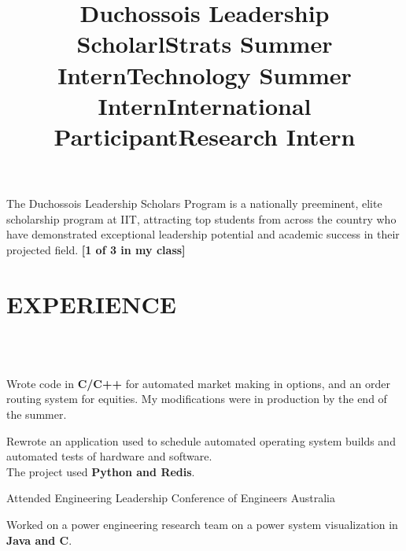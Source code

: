 \documentclass{res}
\begin{document}
\begin{resume}
\title{{\bf Duchossois Leadership Scholar}}
\begin{position}
  The Duchossois Leadership Scholars Program is a nationally preeminent, elite scholarship program at IIT, attracting top students from across the country who have demonstrated exceptional leadership potential and academic success in their projected field. {\bf [1 of 3 in my class]}
\end{position}
 
\section{EXPERIENCE}
\begin{format}
  \title{l}  \\
  \body\\
\end{format}

\title{\bf Strats Summer Intern}
\begin{position}
     Wrote code in {\bf C/C++} for automated market making in options, and an order routing system for equities. My modifications were in production by the end of the summer.
\end{position}

\title{\bf Technology Summer Intern}
\begin{position}
     Rewrote an application used to schedule automated operating system builds and automated tests of hardware and software.\\
     The project used {\bf Python and Redis}.
\end{position}

\title{\bf International Participant}
\begin{position}
  Attended Engineering Leadership Conference of Engineers Australia
\end{position}

\title{\bf Research Intern}
\begin{position}
     Worked on a power engineering research team on a power system visualization in {\bf Java and C}.
\end{position}


\end{resume}
\end{document}
